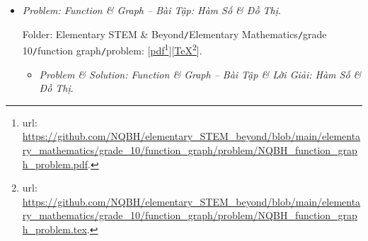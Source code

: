 \documentclass[12pt]{article}
\begin{document}
\begin{itemize}
	Folder: {\sf Elementary STEM \& Beyond{\tt/}Elementary Mathematics{\tt/}grade 10{\tt/}linear system inequations{\tt/}problem}: [\href{https://github.com/NQBH/elementary_STEM_beyond/blob/main/elementary_mathematics/grade_10/linear_system_inequations/problem/NQBH_linear_system_inequations_problem.pdf}{pdf}\footnote{{\sc url}: \url{https://github.com/NQBH/elementary_STEM_beyond/blob/main/elementary_mathematics/grade_10/linear_system_inequations/problem/NQBH_linear_system_inequations_problem.pdf}.}][\href{https://github.com/NQBH/elementary_STEM_beyond/blob/main/elementary_mathematics/grade_10/linear_system_inequations/problem/NQBH_linear_system_inequations_problem.tex}{\TeX}\footnote{{\sc url}: \url{https://github.com/NQBH/elementary_STEM_beyond/blob/main/elementary_mathematics/grade_10/linear_system_inequations/problem/NQBH_linear_system_inequations_problem.tex}.}].
	\begin{itemize}
		\item {\it Problem \& Solution: Inequation \& Linear System of Inequations -- Bài Tập \& Lời Giải: Bất Phương Trình \& Hệ Bất Phương Trình}.
		
		Folder: {\sf Elementary STEM \& Beyond{\tt/}Elementary Mathematics{\tt/}grade 10{\tt/}linear system inequations{\tt/}solution}: [\href{https://github.com/NQBH/elementary_STEM_beyond/blob/main/elementary_mathematics/grade_10/linear_system_inequations/solution/NQBH_linear_system_inequations_solution.pdf}{pdf}\footnote{{\sc url}: \url{https://github.com/NQBH/elementary_STEM_beyond/blob/main/elementary_mathematics/grade_10/linear_system_inequations/solution/NQBH_linear_system_inequations_solution.pdf}.}][\href{https://github.com/NQBH/elementary_STEM_beyond/blob/main/elementary_mathematics/grade_10/linear_system_inequations/solution/NQBH_linear_system_inequations_solution.tex}{\TeX}\footnote{{\sc url}: \url{https://github.com/NQBH/elementary_STEM_beyond/blob/main/elementary_mathematics/grade_10/linear_system_inequations/solution/NQBH_linear_system_inequations_solution.tex}.}].
	\end{itemize}
	\item {\it Problem: Function \& Graph  -- Bài Tập: Hàm Số \& Đồ Thị}.
	
	Folder: {\sf Elementary STEM \& Beyond{\tt/}Elementary Mathematics{\tt/}grade 10{\tt/}function graph{\tt/}problem}: [\href{https://github.com/NQBH/elementary_STEM_beyond/blob/main/elementary_mathematics/grade_10/function_graph/problem/NQBH_function_graph_problem.pdf}{pdf}\footnote{{\sc url}: \url{https://github.com/NQBH/elementary_STEM_beyond/blob/main/elementary_mathematics/grade_10/function_graph/problem/NQBH_function_graph_problem.pdf}.}][\href{https://github.com/NQBH/elementary_STEM_beyond/blob/main/elementary_mathematics/grade_10/function_graph/problem/NQBH_function_graph_problem.tex}{\TeX}\footnote{{\sc url}: \url{https://github.com/NQBH/elementary_STEM_beyond/blob/main/elementary_mathematics/grade_10/function_graph/problem/NQBH_function_graph_problem.tex}.}].
	\begin{itemize}
		\item {\it Problem \& Solution: Function \& Graph  -- Bài Tập \& Lời Giải: Hàm Số \& Đồ Thị}.
		

\end{itemize}
\end{itemize}
\end{document}
